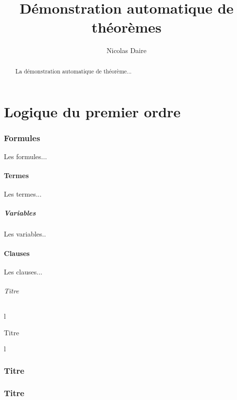 \documentclass[a4paper]{article}
\title{Démonstration automatique de théorèmes}
\author{Nicolas Daire}
\date{}
\begin{document}
\maketitle

\begin{abstract}
La démonstration automatique de théorème...
\end{abstract}

\tableofcontents

\part{Logique du premier ordre}

\section{Formules}

Les formules...

\subsection{Termes}

Les termes...

\subsubsection{Variables}

Les variables..

\subsection{Clauses}

Les clauses...

\paragraph{Titre}

l

\subparagraph{Titre}

l

\appendix

\section{Titre}

\section{Titre}

\listoffigures

\listoftables
\end{document}

